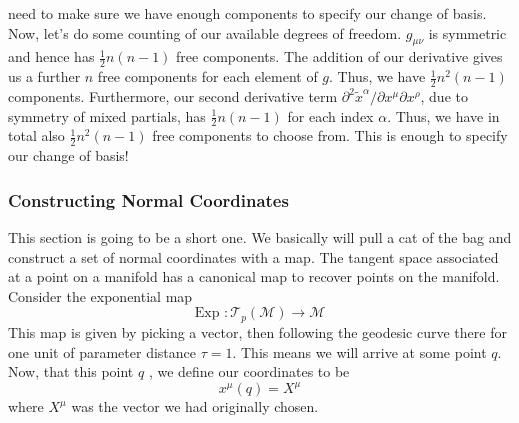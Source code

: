 need to make sure we have enough components
to specify our change of basis. Now, let's do some counting of our available degrees of freedom. 
$ g_{ \mu \nu } $ is symmetric and hence has $ \frac{1}{2 } n ( n -1 ) $
free components. The addition of our derivative gives us a 
further $ n $ free components for each element of $ g $. Thus, 
we have $ \frac{1}{2 } n ^ 2 ( n - 1) $ components. 
Furthermore, our second derivative term $ \partial  ^ 2 \tilde{ x } ^ \alpha / \partial x ^ \mu 
\partial  x ^ \rho $, due to symmetry of mixed partials, has 
$ \frac{1}{ 2} n ( n -1 )  $ for each index $ \alpha$. Thus, 
we have in total also  $ \frac{1}{2 } n ^ 2 (  n- 1) $ 
free components to choose from. This is enough to specify our 
change of basis!

\subsubsection{Constructing Normal Coordinates} 
This section is going to 
be a short one. We basically will pull a cat 
of the bag and construct a set of normal 
coordinates with a map. 
The tangent space associated at a point on a manifold 
has a canonical map to recover points on the manifold. 
Consider the exponential map 
\[
	\text{Exp } : \mathcal{ T }_ p ( \mathcal{ M } ) \to \mathcal{ M }
\] This map is given by picking a vector, then following
the geodesic curve there for one unit of parameter 
distance $ \tau = 1$. This means we will arrive at some point $ q $. 
Now, that this point $ q $ , we define our coordinates to be 
\[
 x ^ \mu ( q) = X^ \mu 
\] where  $ X ^ \mu $ was the vector we had originally chosen. 

 
